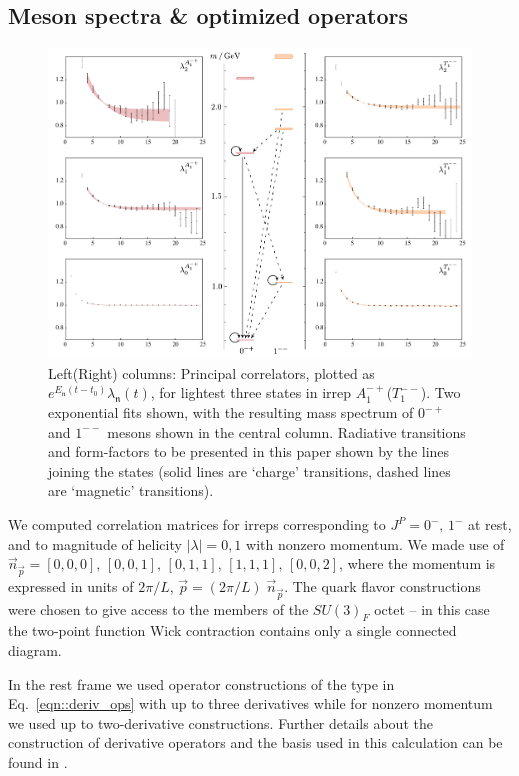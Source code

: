 \documentclass[twocolumn,amsmath,amssymb,prd,10pt,floatfix, 
superscriptaddress,nofootinbib, showpacs, preprintnumbers]{revtex4-1}
\begin{document}
\subsection{Meson spectra \& optimized operators \label{ssec::two_points_spec}}


\begin{figure}
\includegraphics[width=0.9\linewidth]{fig1.pdf}
\caption{
Left(Right) columns: Principal correlators, plotted as $e^{E_\mathfrak{n}(t-t_0)} \lambda_\mathfrak{n}(t)$, for lightest three states in irrep $A_1^{-+}$($T_1^{--}$). Two exponential fits shown, with the resulting mass spectrum of $0^{-+}$ and $1^{--}$ mesons shown in the central column. Radiative transitions and form-factors to be presented in this paper shown by the lines joining the states (solid lines are `charge' transitions, dashed lines are `magnetic' transitions).\label{fig::pcorrs} } 
\end{figure}



We computed correlation matrices for irreps corresponding to $J^P = 0^-,\, 1^-$ at rest, and to magnitude of helicity $|\lambda| = 0,1$ with nonzero momentum. We made use of $\vec{n}_{\vec{p}} =  [0,0,0],\,[0,0,1],\, [0,1,1],\, [1,1,1], \, [0,0,2]$, where the momentum is expressed in units of $2\pi/L$, $\vec{p} = (2\pi/L)\;\vec{n}_{\vec{p}}$. The quark flavor constructions were chosen to give access to the members of the $SU(3)_F$ octet -- in this case the two-point function Wick contraction contains only a single connected diagram.


In the rest frame we used operator constructions of the type in Eq.~\ref{eqn::deriv_ops} with up to three derivatives while for nonzero momentum we used up to two-derivative constructions. Further details about the construction of derivative operators and the basis used in this calculation can be found in \cite{Thomas:2011rh,Dudek:2009qf,Dudek:2010wm,Dudek:2013yja}. 
\end{document}
